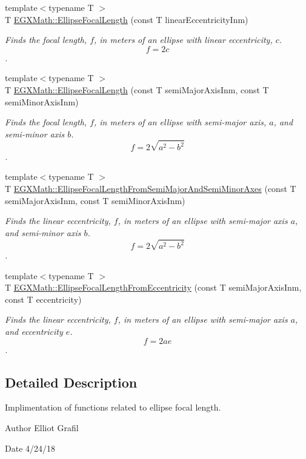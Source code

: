 \begin{DoxyCompactItemize}
\item 
{\footnotesize template$<$typename T $>$ }\\T \mbox{\hyperlink{group___e_g_x_math-_geometry-2_d-_ellipse-_focal_length_gab8d63de7640c880cfecaeada6f2afdac}{E\+G\+X\+Math\+::\+Ellipse\+Focal\+Length}} (const T linear\+Eccentricity\+Inm)
\begin{DoxyCompactList}\small\item\em Finds the focal length, $f$, in meters of an ellipse with linear eccentricity, $c$. \[ f = 2c \]. \end{DoxyCompactList}\item 
{\footnotesize template$<$typename T $>$ }\\T \mbox{\hyperlink{group___e_g_x_math-_geometry-2_d-_ellipse-_focal_length_ga7baefbac49ec6871a8db621ee0591674}{E\+G\+X\+Math\+::\+Ellipse\+Focal\+Length}} (const T semi\+Major\+Axis\+Inm, const T semi\+Minor\+Axis\+Inm)
\begin{DoxyCompactList}\small\item\em Finds the focal length, $f$, in meters of an ellipse with semi-\/major axis, $a$, and semi-\/minor axis $b$. \[ f=2\sqrt{a^2-b^2} \]. \end{DoxyCompactList}\item 
{\footnotesize template$<$typename T $>$ }\\T \mbox{\hyperlink{group___e_g_x_math-_geometry-2_d-_ellipse-_focal_length_ga87a2be49f9539b12f1a5b546e3c6a643}{E\+G\+X\+Math\+::\+Ellipse\+Focal\+Length\+From\+Semi\+Major\+And\+Semi\+Minor\+Axes}} (const T semi\+Major\+Axis\+Inm, const T semi\+Minor\+Axis\+Inm)
\begin{DoxyCompactList}\small\item\em Finds the linear eccentricity, $f$, in meters of an ellipse with semi-\/major axis $a$, and semi-\/minor axis $b$. \[ f=2\sqrt{a^2-b^2} \]. \end{DoxyCompactList}\item 
{\footnotesize template$<$typename T $>$ }\\T \mbox{\hyperlink{group___e_g_x_math-_geometry-2_d-_ellipse-_focal_length_ga08a781f716a2e14f230fe094ecf5b03c}{E\+G\+X\+Math\+::\+Ellipse\+Focal\+Length\+From\+Eccentricity}} (const T semi\+Major\+Axis\+Inm, const T eccentricity)
\begin{DoxyCompactList}\small\item\em Finds the linear eccentricity, $f$, in meters of an ellipse with semi-\/major axis $a$, and eccentricity $e$. \[ f=2 a e \]. \end{DoxyCompactList}\end{DoxyCompactItemize}


\subsection{Detailed Description}
Implimentation of functions related to ellipse focal length. 

\begin{DoxyAuthor}{Author}
Elliot Grafil 
\end{DoxyAuthor}
\begin{DoxyDate}{Date}
4/24/18 
\end{DoxyDate}
